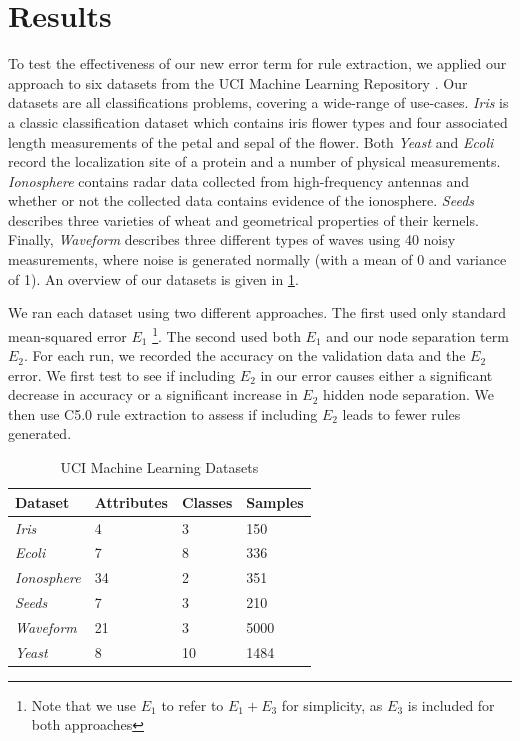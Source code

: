 \section{Results}
\label{sec:results}

To test the effectiveness of our new error term for rule extraction,
we applied our approach to six 
datasets from the UCI Machine Learning Repository \cite{uci}. Our
datasets are all classifications problems, covering a wide-range of
use-cases. \textit{Iris} is a classic classification dataset which
contains iris flower types and four associated length
measurements of the petal and sepal of the flower.
Both \textit{Yeast} and \textit{Ecoli}
record the localization site of a protein and a number of
physical measurements. \textit{Ionosphere} contains radar data collected
from high-frequency antennas and whether or not the collected data
contains evidence of the ionosphere. \textit{Seeds} describes three
varieties of wheat and geometrical properties of their kernels.
Finally, \textit{Waveform} describes three different types of waves
using 40 noisy measurements, where noise is generated normally
(with a mean of 0 and variance of 1).
An overview of our datasets is given in \ref{tab:datasets}.

We ran each dataset using two different approaches. The first
used only standard mean-squared error $E_1$
\footnote{Note that we use $E_1$ to refer to $E_1+E_3$ for simplicity, as
$E_3$ is included for both approaches}. The second used both
$E_1$ and our node separation term $E_2$. For each run, we recorded
the accuracy on the validation data and the $E_2$ error.
We first test to see if including $E_2$ in our error causes either
a significant decrease in accuracy or a significant increase
in $E_2$ hidden node separation. We then use C5.0 rule extraction
to assess if including $E_2$ leads to fewer rules generated.

\begin{table}[]
  \centering
\begin{tabular}{@{}llll@{}}
\toprule
Dataset             & Attributes & Classes & Samples \\ \midrule
\textit{Iris}       & 4          & 3       & 150     \\
\textit{Ecoli}      & 7          & 8       & 336     \\
\textit{Ionosphere} & 34         & 2       & 351     \\
\textit{Seeds}      & 7          & 3       & 210     \\
\textit{Waveform}   & 21         & 3       & 5000    \\ 
\textit{Yeast}      & 8          & 10      & 1484    \\ \bottomrule
\end{tabular}
\caption{UCI Machine Learning Datasets}
\label{tab:datasets}
\end{table}

